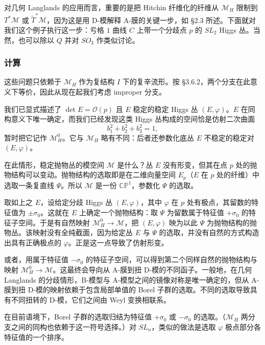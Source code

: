 对几何 Langlands 的应用而言，重要的是把 Hitchin 纤维化的纤维从 $\mathcal{M}_H$ 限制到 $T^*\mathcal{M}$ 或 $\tilde{T}^*\mathcal{M}$，因为这是用 D-模解释 A-膜的关键一步，如 §2.3 所述。下面就对我们这个例子执行这一步：亏格 $1$ 曲线 $C$ 上带一个分歧点 $p$ 的 $SL_2$ Higgs 丛。当然，也可以除以 $Q$ 并对 $SO_3$ 作类似讨论。

\subsubsection{计算}

这些问题只依赖于 $\mathcal{M}_H$ 作为复结构 $I$ 下的复辛流形。按 §3.6.2，两个分支在此意义下等价，因此从现在起我们考虑 improper 分支。

我们已显式描述了 $\det E=\mathcal{O}(p)$ 且 $E$ 稳定的稳定 Higgs 丛 $(E,\varphi)$。$E$ 在同构意义下唯一确定，而我们已经发现这类 Higgs 丛构成的空间恰是仿射二次曲面
\begin{equation}\tag{3.40}
b_1^2+b_2^2+b_3^2=1,
\end{equation}
暂时把它记作 $\mathcal{M}_H^0$。它与 $\mathcal{M}_H$ 略有不同：后者还参数化底丛 $E$ 不稳定的稳定对 $(E,\varphi)$。

在此情形，稳定抛物丛的模空间 $\mathcal{M}$ 是什么？丛 $E$ 没有形变，但其在点 $p$ 处的抛物结构可以变动。抛物结构的选取即是在二维向量空间 $E_p$（$E$ 在 $p$ 处的纤维）中选取一条复直线 $\Psi$。所以 $\mathcal{M}$ 是一份 $\mathbb{C}\mathbb{P}^1$，参数化 $\Psi$ 的选取。

取如上之 $E$，设给定分歧 Higgs 丛 $(E,\varphi)$，其中 $\varphi$ 在 $p$ 处有极点，其留数的特征值为 $\pm\sigma_0$。这就在 $E$ 上确定一个抛物结构：取 $\Psi$ 为留数属于特征值 $+\sigma_0$ 的特征子空间。于是有自然映射 $\mathcal{M}_H^0\to\mathcal{M}$，把 $(E,\varphi)$ 映为以此 $\Psi$ 为抛物结构的抛物丛。该映射没有全纯截面，因为给定丛 $E$ 与 $\Psi$ 的选取，并没有自然的方式构造出具有正确极点的 $\varphi$。正是这一点导致了仿射形变。

或者，用属于特征值 $-\sigma_0$ 的特征子空间，可以得到第二个同样自然的抛物结构与映射 $\mathcal{M}_H^0\to\mathcal{M}$。这最终会导向从 A-膜到扭 D-模的不同函子。一般地，在几何 Langlands 的分歧情形，B-模型与 A-模型之间的镜像对称是唯一确定的，但从 A-膜到扭 D-模的映射依赖于包含局部单值的 Borel 子群的选取。不同的选取导致具有不同扭转的 D-模，它们之间由 Weyl 变换相联系。

在目前语境下，Borel 子群的选取归结为特征值 $+\sigma_0$ 或 $-\sigma_0$ 的选取。（$\mathcal{M}_H$ 两分支之间的同构也依赖于这一符号选择。）对 $SL_n$，类似的做法是选取 $\varphi$ 极点部分各特征值的一个排序。

